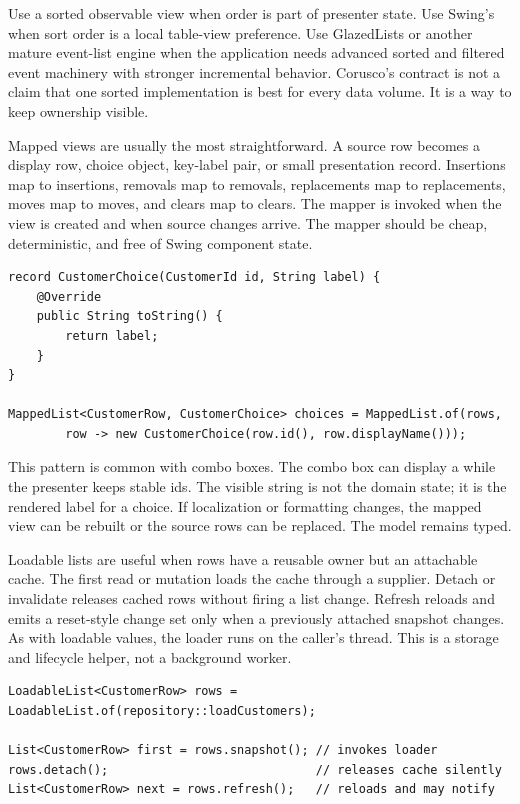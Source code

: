 Use a sorted observable view when order is part of presenter state. Use Swing's
 when sort order is a local table-view preference. Use GlazedLists
or another mature event-list engine when the application needs advanced sorted
and filtered event machinery with stronger incremental behavior. Corusco's
contract is not a claim that one sorted implementation is best for every data
volume. It is a way to keep ownership visible.

Mapped views are usually the most straightforward. A source row becomes a display
row, choice object, key-label pair, or small presentation record. Insertions map
to insertions, removals map to removals, replacements map to replacements, moves
map to moves, and clears map to clears. The mapper is invoked when the view is
created and when source changes arrive. The mapper should be cheap,
deterministic, and free of Swing component state.

\begin{lstlisting}[caption={Map domain rows into stable combo choices.}]
record CustomerChoice(CustomerId id, String label) {
    @Override
    public String toString() {
        return label;
    }
}

MappedList<CustomerRow, CustomerChoice> choices = MappedList.of(rows,
        row -> new CustomerChoice(row.id(), row.displayName()));
\end{lstlisting}

This pattern is common with combo boxes. The combo box can display a
 while the presenter keeps stable ids. The visible string is
not the domain state; it is the rendered label for a choice. If localization or
formatting changes, the mapped view can be rebuilt or the source rows can be
replaced. The model remains typed.

Loadable lists are useful when rows have a reusable owner but an attachable
cache. The first read or mutation loads the cache through a supplier. Detach or
invalidate releases cached rows without firing a list change. Refresh reloads
and emits a reset-style change set only when a previously attached snapshot
changes. As with loadable values, the loader runs on the caller's thread. This
is a storage and lifecycle helper, not a background worker.

\begin{lstlisting}[caption={Loadable rows have cache lifecycle, not magic threading.}]
LoadableList<CustomerRow> rows = LoadableList.of(repository::loadCustomers);

List<CustomerRow> first = rows.snapshot(); // invokes loader
rows.detach();                             // releases cache silently
List<CustomerRow> next = rows.refresh();   // reloads and may notify
\end{lstlisting}

